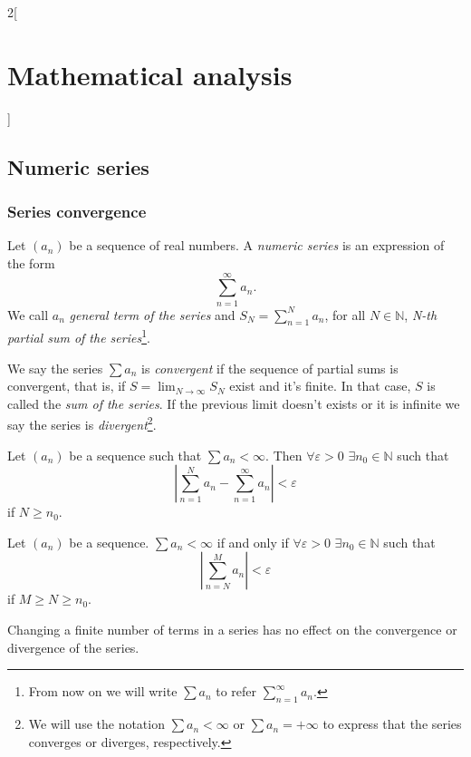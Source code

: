 \documentclass[../../../main.tex]{subfiles}
\begin{document}
\begin{multicols}{2}[\section{Mathematical analysis}]
\subsection{Numeric series}
\subsubsection*{Series convergence}
\begin{definition}
Let $(a_n)$ be a sequence of real numbers. A \textit{numeric series} is an expression of the form $$\sum_{n=1}^\infty a_n.$$ We call $a_n$ \textit{general term of the series} and $\displaystyle S_N=\sum_{n=1}^N a_n$, for all $N\in\mathbb{N}$, \textit{N-th partial sum of the series}\footnote{From now on we will write $\sum a_n$ to refer $\displaystyle\sum_{n=1}^\infty a_n$.}.
\end{definition}
\begin{definition}
We say the series $\sum a_n$ is \textit{convergent} if the sequence of partial sums is convergent, that is, if $\displaystyle S=\lim_{N\to\infty}S_N$ exist and it's finite. In that case, $S$ is called the \textit{sum of the series}. If the previous limit doesn't exists or it is infinite we say the series is \textit{divergent}\footnote{We will use the notation $\sum a_n<\infty$ or $\sum a_n=+\infty$ to express that the series converges or diverges, respectively.}.
\end{definition}
\begin{prop}
Let $(a_n)$ be a sequence such that $\sum a_n<\infty$. Then $\forall\varepsilon>0$ $\exists n_0\in\mathbb{N}$ such that $$\left|\sum_{n=1}^N a_n-\sum_{n=1}^\infty a_n\right|<\varepsilon$$ if $N\geq n_0$.
\end{prop}
\begin{theorem}
Let $(a_n)$ be a sequence. $\sum a_n<\infty$ if and only if $\forall\varepsilon>0$ $\exists n_0\in\mathbb{N}$ such that $$\left|\sum_{n=N}^Ma_n\right|<\varepsilon$$ if $M\geq N\geq n_0$.
\end{theorem}
\begin{corollary}
Changing a finite number of terms in a series has no effect on the convergence or divergence of the series.
\end{corollary}
\begin{corollary}

\end{corollary}
\end{multicols}
\end{document}

